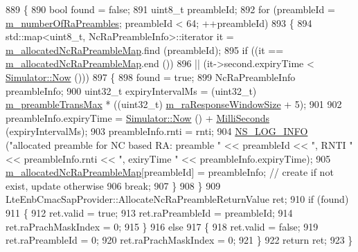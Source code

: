 \begin{DoxyCode}
889 \{
890   \textcolor{keywordtype}{bool} found = \textcolor{keyword}{false};
891   uint8\_t preambleId;
892   \textcolor{keywordflow}{for} (preambleId = \hyperlink{classns3_1_1LteEnbMac_aa907c42f35e48b0c3cba70d645685342}{m\_numberOfRaPreambles}; preambleId < 64; ++preambleId)
893     \{
894       std::map<uint8\_t, NcRaPreambleInfo>::iterator it = 
      \hyperlink{classns3_1_1LteEnbMac_aa4d985440ec2e62eb521203a8e96e901}{m\_allocatedNcRaPreambleMap}.find (preambleId);
895       \textcolor{keywordflow}{if} ((it ==  \hyperlink{classns3_1_1LteEnbMac_aa4d985440ec2e62eb521203a8e96e901}{m\_allocatedNcRaPreambleMap}.end ())
896           || (it->second.expiryTime < \hyperlink{classns3_1_1Simulator_ac3178fa975b419f7875e7105be122800}{Simulator::Now} ()))
897         \{
898           found = \textcolor{keyword}{true};
899           NcRaPreambleInfo preambleInfo;
900           uint32\_t expiryIntervalMs = (uint32\_t) \hyperlink{classns3_1_1LteEnbMac_aa0619f1df983d20233b69ec7dac89af8}{m\_preambleTransMax} * ((uint32\_t) 
      \hyperlink{classns3_1_1LteEnbMac_a8d651db96b6da7d09b67d6faa0e0c8a9}{m\_raResponseWindowSize} + 5); 
901           
902           preambleInfo.expiryTime = \hyperlink{classns3_1_1Simulator_ac3178fa975b419f7875e7105be122800}{Simulator::Now} () + 
      \hyperlink{group__timecivil_gaf26127cf4571146b83a92ee18679c7a9}{MilliSeconds} (expiryIntervalMs);
903           preambleInfo.rnti = rnti;
904           \hyperlink{group__logging_gafbd73ee2cf9f26b319f49086d8e860fb}{NS\_LOG\_INFO} (\textcolor{stringliteral}{"allocated preamble for NC based RA: preamble "} << preambleId << \textcolor{stringliteral}{", RNTI 
      "} << preambleInfo.rnti << \textcolor{stringliteral}{", exiryTime "} << preambleInfo.expiryTime);
905           \hyperlink{classns3_1_1LteEnbMac_aa4d985440ec2e62eb521203a8e96e901}{m\_allocatedNcRaPreambleMap}[preambleId] = preambleInfo; \textcolor{comment}{// create if not
       exist, update otherwise}
906           \textcolor{keywordflow}{break};
907         \}
908     \}
909   LteEnbCmacSapProvider::AllocateNcRaPreambleReturnValue ret;
910   \textcolor{keywordflow}{if} (found)
911     \{
912       ret.valid = \textcolor{keyword}{true};
913       ret.raPreambleId = preambleId;
914       ret.raPrachMaskIndex = 0;
915     \}
916   \textcolor{keywordflow}{else}
917     \{
918       ret.valid = \textcolor{keyword}{false};
919       ret.raPreambleId = 0;
920       ret.raPrachMaskIndex = 0;
921     \}
922   \textcolor{keywordflow}{return} ret;
923 \}
\end{DoxyCode}


